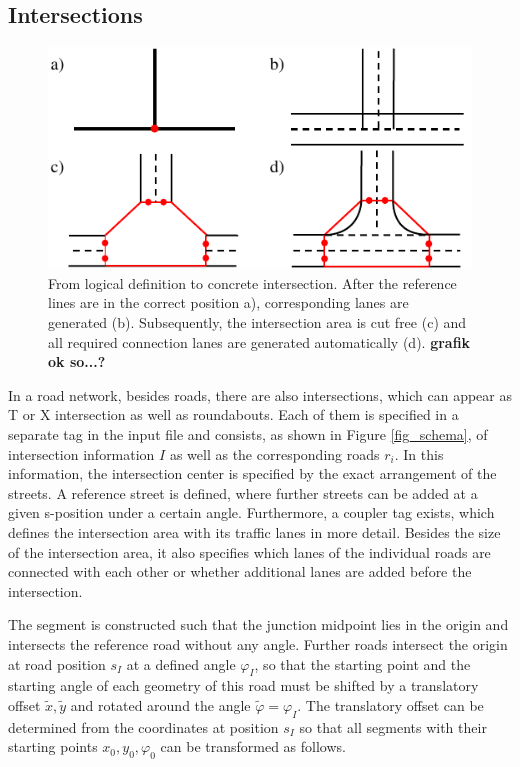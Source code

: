 \documentclass[a4paper, 10pt, conference]{ieeeconf}      %
\begin{document}
\subsection{Intersections}
    \begin{figure}[thpb]        
        \centering
        \includegraphics{fig/createJunction.pdf}
        \caption{From logical definition to concrete intersection. After the reference lines are in the correct position a), corresponding lanes are generated (b). Subsequently, the intersection area is cut free (c) and all required connection lanes are generated automatically (d). \textbf{grafik ok so...?}}
        \label{fig_createJunction}
    \end{figure}

    In a road network, besides roads, there are also intersections, which can appear as T or X intersection as well as roundabouts. Each of them is specified in a separate tag in the input file and consists, as shown in Figure \ref{fig_schema}, of intersection information \(I\) as well as the corresponding roads \(r_i\). In this information, the intersection center is specified by the exact arrangement of the streets. A reference street is defined, where further streets can be added at a given s-position under a certain angle. Furthermore, a coupler tag exists, which defines the intersection area with its traffic lanes in more detail. Besides the size of the intersection area, it also specifies which lanes of the individual roads are connected with each other or whether additional lanes are added before the intersection.

    The segment is constructed such that the junction midpoint lies in the origin and intersects the reference road without any angle. Further roads intersect the origin at road position \(s_I\) at a defined angle \(\varphi_I\), so that the starting point and the starting angle of each geometry of this road must be shifted by a translatory offset \(\tilde{x}, \tilde{y}\) and rotated around the angle \(\tilde{\varphi} = \varphi_I\). The translatory offset can be determined from the coordinates at position \(s_I\) so that all segments with their starting points \(x_0,y_0,\varphi_0\) can be transformed as follows.
\end{document}
